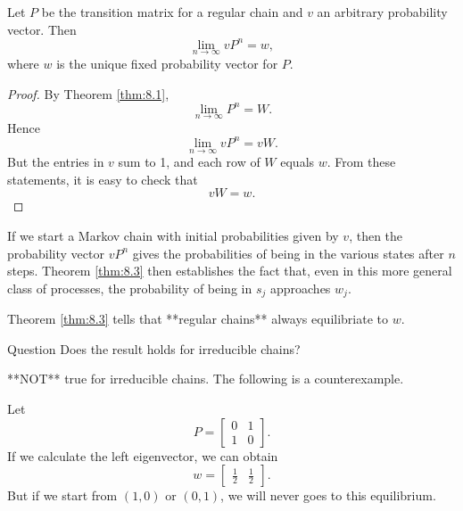 \begin{theorem}
\label{thm:8.3}
Let $P$ be the transition matrix for a regular chain and $v$ an arbitrary probability vector. Then
\begin{equation*}
    \lim_{n\to\infty} vP^n = w,
\end{equation*}
where $w$ is the unique fixed probability vector for $P$.
\end{theorem}

\begin{proof}
By Theorem \ref{thm:8.1},
\begin{equation*}
    \lim_{n\to\infty} P^n = W.
\end{equation*}
Hence 
\begin{equation*}
    \lim_{n\to\infty} vP^n = vW.
\end{equation*}
But the entries in $v$ sum to 1, and each row of $W$ equals $w$. From these statements, it is easy to check that
\begin{equation*}
    vW = w.
\end{equation*}
\end{proof}

\begin{remark}
If we start a Markov chain with initial probabilities given by $v$, then the probability vector $v P^n$ gives the probabilities of being in the various states after $n$ steps. Theorem \ref{thm:8.3} then establishes the fact that, even in this more general class of processes, the probability of being in $s_j$ approaches $w_j$.
\end{remark}

\begin{remark}
Theorem \ref{thm:8.3} tells that **regular chains** always equilibriate to $w$.
\end{remark}

\begin{newnotion}{Question}
Does the result holds for irreducible chains?
\end{newnotion}
**NOT** true for irreducible chains. The following is a counterexample.
\begin{example}
Let 
\begin{equation*}
    P = \begin{bmatrix} 0 & 1 \\ 1 & 0 \end{bmatrix}.
\end{equation*}
If we calculate the left eigenvector, we can obtain 
\begin{equation*}
    w = \begin{bmatrix} \frac{1}{2} & \frac{1}{2} \end{bmatrix}.
\end{equation*}
But if we start from $(1,0)$ or $(0,1)$, we will never goes to this equilibrium.
\end{example}

